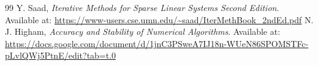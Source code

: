 \documentclass[11pt,a4paper]{article}
\begin{document}
\newpage
\begin{thebibliography}{99}
 Y. Saad, \emph{Iterative Methods for Sparse Linear Systems Second Edition}. Available at: \url{https://www-users.cse.umn.edu/~saad/IterMethBook_2ndEd.pdf}
 N. J. Higham, \emph{Accuracy and Stability of Numerical Algorithms}. Available at: \url{https://docs.google.com/document/d/1jnC3PSweA7IJ18n-WUeN86SPOMSTFc-pLvlQWj5PtnE/edit?tab=t.0}
\end{thebibliography}
\end{document}
